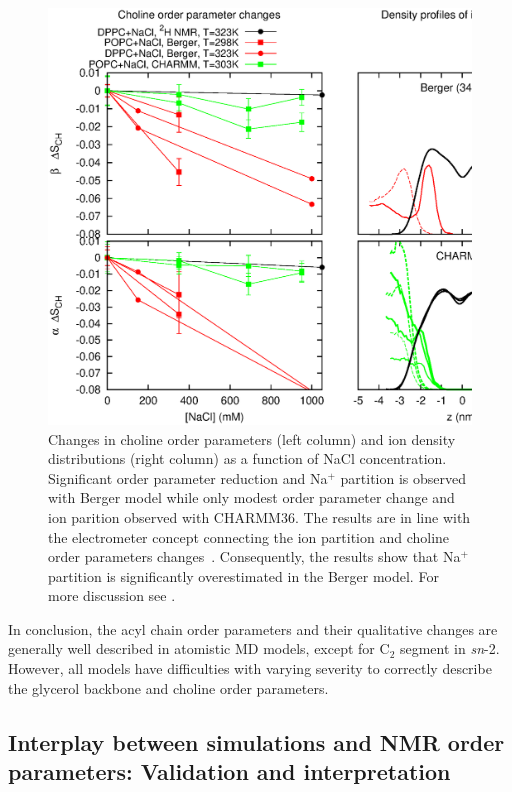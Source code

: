 \documentclass[aps,prl,superscriptaddress,twocolumn]{revtex4}
\begin{document}
\begin{figure}[]
  \includegraphics[width=17.2cm]{../Fig/changesDUEna.eps}
\newline
  \caption{\label{changesDUEna}
    Changes in choline order parameters (left column) and ion density distributions (right column)
    as a function of NaCl concentration. Significant order parameter
    reduction and Na$^+$ partition is observed with Berger model while only modest order parameter change
    and ion parition observed with CHARMM36. The results are in line with the electrometer concept
    connecting the ion partition and choline order parameters changes~\cite{akutsu81,altenbach84,seelig87,scherer89}.
    Consequently, the results show that Na$^+$ partition is significantly overestimated in the Berger model. 
    For more discussion see \cite{ionpaper}.
  } 
\end{figure}

In conclusion, the acyl chain order parameters and their qualitative changes are 
generally well described in atomistic MD models, except for C$_2$ segment in {\it sn}-2.
However, all models have difficulties with varying severity to correctly describe 
the glycerol backbone and choline order parameters.



\subsection{Interplay between simulations and NMR order parameters: Validation and interpretation}\label{OPinterplay}
\end{document}
